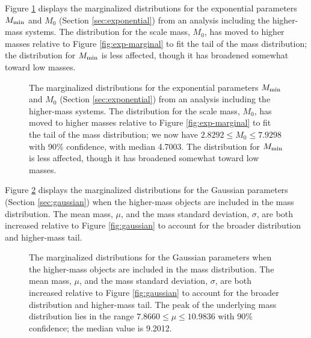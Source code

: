 \documentclass[preprint]{aastex}
\newcommand{\Mmin}{M_{\textnormal{min}}}
\begin{document}
Figure \ref{fig:exp-cutoff-high} displays the marginalized
distributions for the exponential parameters $\Mmin$ and $M_0$
(Section \ref{sec:exponential}) from an analysis including the
higher-mass systems.  The distribution for the scale mass, $M_0$, has
moved to higher masses relative to Figure \ref{fig:exp-marginal} to
fit the tail of the mass distribution; the distribution for $\Mmin$ is
less affected, though it has broadened somewhat toward low masses.

\begin{figure}
  \begin{center}
  \end{center}
  \caption{\label{fig:exp-cutoff-high} The marginalized distributions
    for the exponential parameters $\Mmin$ and $M_0$ (Section
    \ref{sec:exponential}) from an analysis including the higher-mass
    systems.  The distribution for the scale mass, $M_0$, has moved to
    higher masses relative to Figure \ref{fig:exp-marginal} to fit the
    tail of the mass distribution; we now have $2.8292 \leq M_0 \leq
    7.9298$ with 90\% confidence, with median 4.7003.  The
    distribution for $\Mmin$ is less affected, though it has broadened
    somewhat toward low masses.}
\end{figure}

Figure \ref{fig:gaussian-high} displays the marginalized distributions
for the Gaussian parameters (Section \ref{sec:gaussian}) when the
higher-mass objects are included in the mass distribution.  The mean
mass, $\mu$, and the mass standard deviation, $\sigma$, are both
increased relative to Figure \ref{fig:gaussian} to account for the
broader distribution and higher-mass tail.

\begin{figure}
  \begin{center}
  \end{center}
  \caption{\label{fig:gaussian-high} The marginalized distributions
    for the Gaussian parameters when the higher-mass objects are
    included in the mass distribution.  The mean mass, $\mu$, and the
    mass standard deviation, $\sigma$, are both increased relative to
    Figure \ref{fig:gaussian} to account for the broader distribution
    and higher-mass tail.  The peak of the underlying mass
    distribution lies in the range $7.8660 \leq \mu \leq 10.9836$ with
    90\% confidence; the median value is 9.2012.}
\end{figure}
\end{document}
